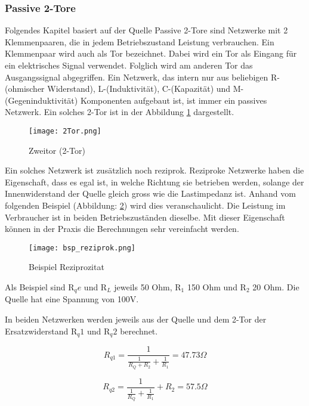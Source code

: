  \subsubsection{Passive 2-Tore} \label{subsubsec:2tore}
 Folgendes Kapitel basiert auf der Quelle \cite{p._niklaus_2-tore_2019} Passive 2-Tore sind Netzwerke mit 2 Klemmenpaaren, die in jedem Betriebszustand Leistung verbrauchen. Ein Klemmenpaar wird auch als Tor bezeichnet. Dabei wird ein Tor als Eingang für ein elektrisches Signal verwendet. Folglich wird am anderen Tor das Ausgangssignal abgegriffen. Ein Netzwerk, das intern nur aus beliebigen R-(ohmischer Widerstand), L-(Induktivität), C-(Kapazität) und M-(Gegeninduktivität) Komponenten aufgebaut ist, ist immer ein passives Netzwerk. Ein solches 2-Tor ist in der Abbildung \ref{fig:tor2} dargestellt.

\begin{figure}[H]
	\centering
	\texttt{[image: 2Tor.png]}
	\caption{Zweitor (2-Tor) \cite{p._niklaus_2-tore_2019} }
	\label{fig:tor2}
\end{figure}

Ein solches Netzwerk ist zusätzlich noch reziprok. Reziproke Netzwerke haben die Eigenschaft, dass es egal ist, in welche Richtung sie betrieben werden, solange der Innenwiderstand der Quelle gleich gross wie die Lastimpedanz ist. Anhand vom folgenden Beispiel (Abbildung: \ref{fig:bsp_reziprok}) wird dies veranschaulicht. Die Leistung im Verbraucher ist in beiden Betriebszuständen dieselbe. Mit dieser Eigenschaft können in der  Praxis die Berechnungen sehr vereinfacht werden. 

\begin{figure}[H]
	\centering
	\texttt{[image: bsp\_reziprok.png]}
	\caption{Beispiel Reziprozitat}
	\label{fig:bsp_reziprok}
\end{figure}


Als Beispiel sind R$_qe$ und R$_L$ jeweils 50 Ohm, R$_1$ 150 Ohm und R$_2$ 20 Ohm. Die Quelle hat eine Spannung von 100V.

In beiden Netzwerken werden jeweils aus der Quelle und dem 2-Tor der Ersatzwiderstand  R$_q1$ und R$_q2$ berechnet.

\begin{equation}\label{equ:rqe1}
			R_{q1} = \frac{1}{\frac{1}{R_Q+R_2}+\frac{1}{R_1}} =  47.73 \Omega 
		\end{equation}
		
\begin{equation}\label{equ:rqe2}
			R_{q2} = \frac{1}{\frac{1}{R_Q}+\frac{1}{R_1}} +R_2 =  57.5 \Omega 
		\end{equation}

